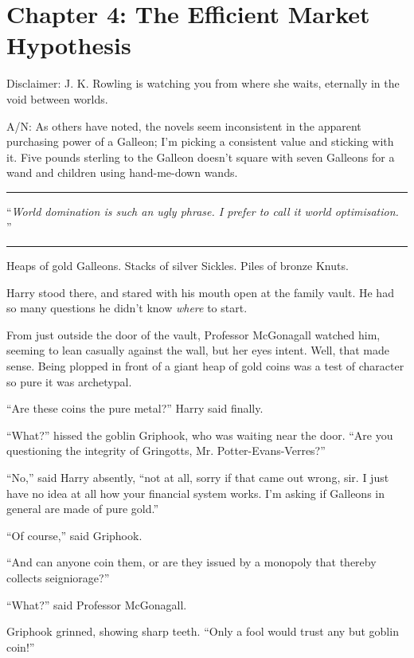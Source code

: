 \chapter{Chapter 4: The Efficient Market Hypothesis}
Disclaimer: J. K. Rowling is watching you from where she waits,
eternally in the void between worlds.

A/N: As others have noted, the novels seem inconsistent in the apparent
purchasing power of a Galleon; I'm picking a consistent value and
sticking with it. Five pounds sterling to the Galleon doesn't square
with seven Galleons for a wand and children using hand-me-down wands.

\begin{center}\rule{3in}{0.4pt}\end{center}

``\emph{World domination is such an ugly phrase. I prefer to call it
world optimisation.} ''

\begin{center}\rule{3in}{0.4pt}\end{center}

Heaps of gold Galleons. Stacks of silver Sickles. Piles of bronze Knuts.

Harry stood there, and stared with his mouth open at the family vault.
He had so many questions he didn't know \emph{where} to start.

From just outside the door of the vault, Professor McGonagall watched
him, seeming to lean casually against the wall, but her eyes intent.
Well, that made sense. Being plopped in front of a giant heap of gold
coins was a test of character so pure it was archetypal.

``Are these coins the pure metal?'' Harry said finally.

``What?'' hissed the goblin Griphook, who was waiting near the door.
``Are you questioning the integrity of Gringotts, Mr.
Potter-Evans-Verres?''

``No,'' said Harry absently, ``not at all, sorry if that came out wrong,
sir. I just have no idea at all how your financial system works. I'm
asking if Galleons in general are made of pure gold.''

``Of course,'' said Griphook.

``And can anyone coin them, or are they issued by a monopoly that
thereby collects seigniorage?''

``What?'' said Professor McGonagall.

Griphook grinned, showing sharp teeth. ``Only a fool would trust any but
goblin coin!''

